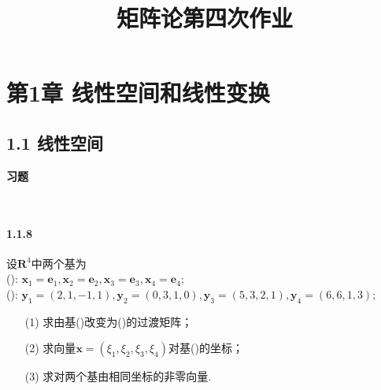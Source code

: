 \documentclass[12pt, a4paper, oneside, fontset=none]{ctexart}
\author{}
\date{}
\title{\vspace{-3em}\textbf{矩阵论\quad 第四次作业}\vspace{-3em}}
\begin{document}
\maketitle

\section*{第1章 \quad 线性空间和线性变换}

\subsection*{1.1 \quad 线性空间}

\centerline{\large{\textbf{习题}}} \ \par

\paragraph*{1.1.8} 设$\mathbf{R}^4$中两个基为 \\
(\uppercase\expandafter{}): $\bm{x}_1 = \bm{e}_1 \bm{,}\bm{x}_2 = \bm{e}_2\bm{,}\bm{x}_3 = \bm{e}_3\bm{,}\bm{x}_4 = \bm{e}_4\bm{;}$ \\
(\uppercase\expandafter{}): $\bm{y}_1 = (2,1,-1,1) \bm{,}\bm{y}_2 = (0,3,1,0)\bm{,}\bm{y}_3 = (5,3,2,1)\bm{,}\bm{y}_4 = (6,6,1,3)\bm{;}$
\begin{enumerate}
    \item[(1)] 求由基(\uppercase\expandafter{})改变为(\uppercase\expandafter{})的过渡矩阵；
    \item[(2)] 求向量$\bm{x} = (\xi_1, \xi_2, \xi_3, \xi_4)$对基(\uppercase\expandafter{})的坐标；
    \item[(3)] 求对两个基由相同坐标的非零向量.
\end{enumerate}
\end{document}
